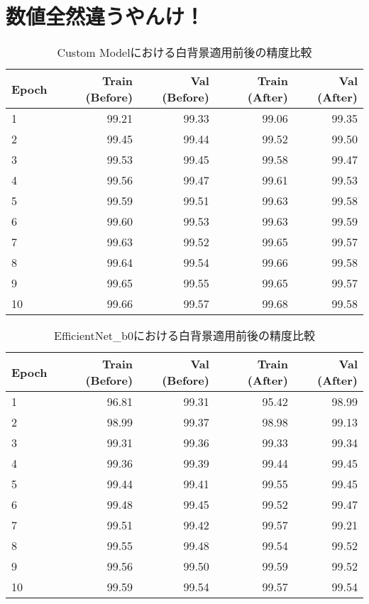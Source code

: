 \documentclass[a4paper,11pt,titlepage]{jsarticle}
\begin{document}
\section{数値全然違うやんけ！}
\begin{table}[H]
\centering
\caption{Custom Modelにおける白背景適用前後の精度比較}
\label{tab:Custom_compare}
\begin{tabular}{l|rr|rr}
\hline
Epoch & Train (Before) & Val (Before) & Train (After) & Val (After) \\
\hline
1  & 99.21 & 99.33 & 99.06 & 99.35 \\
2  & 99.45 & 99.44 & 99.52 & 99.50 \\
3  & 99.53 & 99.45 & 99.58 & 99.47 \\
4  & 99.56 & 99.47 & 99.61 & 99.53 \\
5  & 99.59 & 99.51 & 99.63 & 99.58 \\
6  & 99.60 & 99.53 & 99.63 & 99.59 \\
7  & 99.63 & 99.52 & 99.65 & 99.57 \\
8  & 99.64 & 99.54 & 99.66 & 99.58 \\
9  & 99.65 & 99.55 & 99.65 & 99.57 \\
10 & 99.66 & 99.57 & 99.68 & 99.58 \\
\hline
\end{tabular}
\end{table}


\begin{table}[H]
\centering
\caption{EfficientNet\_b0における白背景適用前後の精度比較}
\label{tab:Efficientnetb0_compare}
\begin{tabular}{l|rr|rr}
\hline
Epoch & Train (Before) & Val (Before) & Train (After) & Val (After) \\
\hline
1  & 96.81 & 99.31 & 95.42 & 98.99 \\
2  & 98.99 & 99.37 & 98.98 & 99.13 \\
3  & 99.31 & 99.36 & 99.33 & 99.34 \\
4  & 99.36 & 99.39 & 99.44 & 99.45 \\
5  & 99.44 & 99.41 & 99.55 & 99.45 \\
6  & 99.48 & 99.45 & 99.52 & 99.47 \\
7  & 99.51 & 99.42 & 99.57 & 99.21 \\
8  & 99.55 & 99.48 & 99.54 & 99.52 \\
9  & 99.56 & 99.50 & 99.59 & 99.52 \\
10 & 99.59 & 99.54 & 99.57 & 99.54 \\
\hline
\end{tabular}
\end{table}
\end{document}
